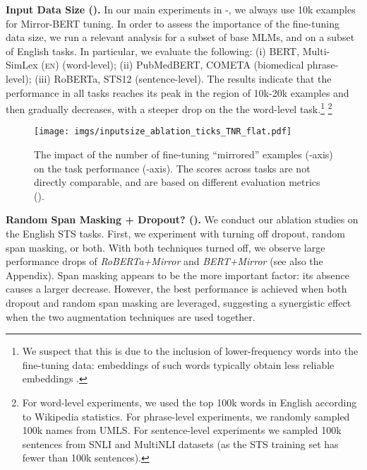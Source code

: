 \documentclass[11pt]{article}
\newcommand{\en}{{\textsc{en}}\xspace}
\begin{document}
\vspace{1.5mm}
\noindent \textbf{Input Data Size ().} In our main experiments in -, we always use 10k examples for Mirror-BERT tuning. In order to assess the importance of the fine-tuning data size, we run a relevant analysis for a subset of base MLMs, and on a subset of English tasks. In particular, we evaluate the following: (i) BERT, Multi-SimLex (\en) (word-level); (ii) PubMedBERT, COMETA (biomedical phrase-level); (iii) RoBERTa, STS12 (sentence-level). The results indicate that the performance in all tasks reaches its peak in the region of 10k-20k examples and then gradually decreases, with a steeper drop on the the word-level task.\footnote{
We suspect that this is due to the inclusion of lower-frequency words into the fine-tuning data: embeddings of such words typically obtain less reliable embeddings \cite{Pilehvar:2018emnlp}.}
\footnote{For word-level experiments, we used the top 100k words in English according to Wikipedia statistics. For phrase-level experiments, we randomly sampled 100k names from UMLS. For sentence-level experiments we sampled 100k sentences from SNLI and MultiNLI datasets (as the STS training set has fewer than 100k sentences).}

\begin{figure}[t!]
    \centering
    \texttt{[image: imgs/inputsize\_ablation\_ticks\_TNR\_flat.pdf]}
\caption{The impact of the number of fine-tuning ``mirrored'' examples (-axis) on the task performance (-axis). The scores across tasks are not directly comparable, and are based on different evaluation metrics ().}
    \label{fig:input_size_ablation}
\end{figure}



\vspace{1.5mm}
\noindent \textbf{Random Span Masking + Dropout? ().} 
We conduct our ablation studies on the English STS tasks. First, we experiment with turning off dropout, random span masking, or both. With both techniques turned off, we observe large performance drops of \textit{RoBERTa+Mirror} and \textit{BERT+Mirror} (see also the Appendix). Span masking appears to be the more important factor: its absence causes a larger decrease. However, the best performance is achieved when both dropout and random span masking are leveraged, suggesting a synergistic effect when the two augmentation techniques are used together. 
\end{document}
